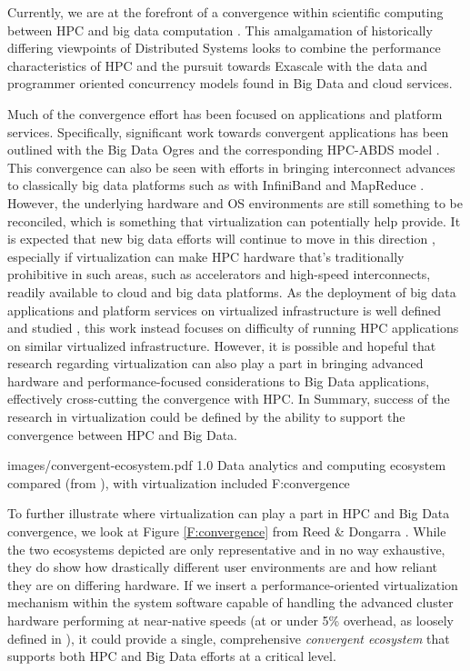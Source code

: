 Currently, we are at the forefront of a convergence within scientific computing between HPC and big data computation \cite{reed2015exascale}. This amalgamation of historically differing viewpoints of Distributed Systems looks to combine the performance characteristics of HPC and the pursuit towards Exascale with the data and programmer oriented concurrency models found in Big Data and cloud services. 

Much of the convergence effort has been focused on applications and platform services. Specifically, significant work towards convergent applications has been outlined with the Big Data Ogres \cite{Jha2014apache} and the corresponding HPC-ABDS model \cite{qiu2014towards}.  This convergence can also be seen with efforts in bringing interconnect advances to classically big data platforms such as with InfiniBand and MapReduce \cite{panda2013hadoop}. However, the underlying hardware and OS environments are still something to be reconciled, which is something that virtualization can potentially help provide. It is expected that new big data efforts will continue to move in this direction \cite{ekanayake2016spidal}, especially if virtualization can make HPC hardware that's traditionally prohibitive in such areas, such as accelerators and high-speed interconnects, readily available to cloud and big data platforms. As the deployment of big data applications and platform services on virtualized infrastructure is well defined and studied \cite{tian2011towards}, this work instead focuses on difficulty of running HPC applications on similar virtualized infrastructure.  However, it is possible and hopeful that research regarding virtualization can also play a part in bringing advanced hardware and performance-focused considerations to Big Data applications, effectively cross-cutting the convergence with HPC. In Summary, success of the research in virtualization could be defined by the ability to support the convergence between HPC and Big Data.

 {images/convergent-ecosystem.pdf}
 {1.0}
 {Data analytics and computing ecosystem compared (from \cite{reed2015exascale}), with virtualization included}
 {F:convergence}


To further illustrate where virtualization can play a part in HPC and Big Data convergence, we look at Figure \ref{F:convergence} from Reed \& Dongarra \cite{reed2015exascale}. While the two ecosystems depicted are only representative and in no way exhaustive, they do show how drastically different user environments are and how reliant they are on differing hardware. If we insert a performance-oriented virtualization mechanism within the system software capable of handling the advanced cluster hardware performing at near-native speeds (at or under 5\% overhead, as loosely defined in \cite{lange2010palacios}), it could provide a single, comprehensive \emph{convergent ecosystem} that supports both HPC and Big Data efforts at a critical level. 


